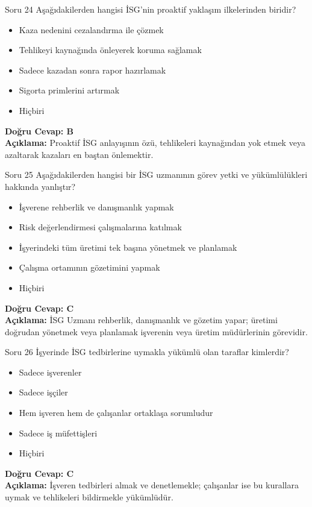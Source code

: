 \documentclass[12pt,a4paper]{article}
\begin{document}
\begin{testcard}{Soru 24}
    Aşağıdakilerden hangisi İSG'nin proaktif yaklaşım ilkelerinden biridir?
    \begin{itemize}
        \item[A)] Kaza nedenini cezalandırma ile çözmek
        \item[B)] Tehlikeyi kaynağında önleyerek koruma sağlamak
        \item[C)] Sadece kazadan sonra rapor hazırlamak
        \item[D)] Sigorta primlerini artırmak
        \item[E)] Hiçbiri
    \end{itemize}
    \tcblower
    \textbf{Doğru Cevap: B} \\
    \textbf{Açıklama:} Proaktif İSG anlayışının özü, tehlikeleri kaynağından yok etmek veya azaltarak kazaları en baştan önlemektir.
\end{testcard}

\begin{testcard}{Soru 25}
    Aşağıdakilerden hangisi bir İSG uzmanının görev yetki ve yükümlülükleri hakkında yanlıştır?
    \begin{itemize}
        \item[A)] İşverene rehberlik ve danışmanlık yapmak
        \item[B)] Risk değerlendirmesi çalışmalarına katılmak
        \item[C)] İşyerindeki tüm üretimi tek başına yönetmek ve planlamak
        \item[D)] Çalışma ortamının gözetimini yapmak
        \item[E)] Hiçbiri
    \end{itemize}
    \tcblower
    \textbf{Doğru Cevap: C} \\
    \textbf{Açıklama:} İSG Uzmanı rehberlik, danışmanlık ve gözetim yapar; üretimi doğrudan yönetmek veya planlamak işverenin veya üretim müdürlerinin görevidir.
\end{testcard}

\begin{testcard}{Soru 26}
    İşyerinde İSG tedbirlerine uymakla yükümlü olan taraflar kimlerdir?
    \begin{itemize}
        \item[A)] Sadece işverenler
        \item[B)] Sadece işçiler
        \item[C)] Hem işveren hem de çalışanlar ortaklaşa sorumludur
        \item[D)] Sadece iş müfettişleri
        \item[E)] Hiçbiri
    \end{itemize}
    \tcblower
    \textbf{Doğru Cevap: C} \\
    \textbf{Açıklama:} İşveren tedbirleri almak ve denetlemekle; çalışanlar ise bu kurallara uymak ve tehlikeleri bildirmekle yükümlüdür.
\end{testcard}
\end{document}

